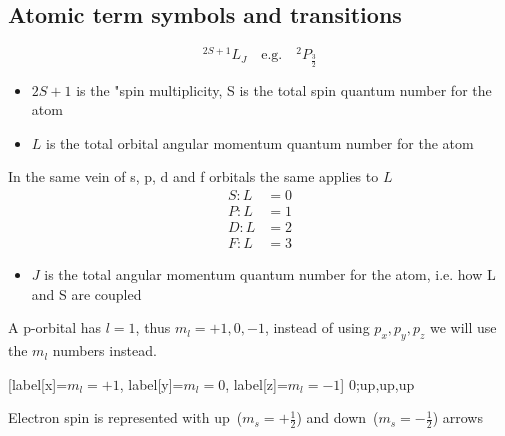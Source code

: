 \documentclass{article}
\begin{document}
    \subsection{Atomic term symbols and transitions}
    {\huge $$^{2S+1}L_J \quad \text{e.g.} \quad ^{2}P_{\frac{3}{2}}$$}

    \begin{itemize}
        \item $2S+1$ is the "spin multiplicity, S is the total spin quantum number for the atom
        \item $L$ is the total orbital angular momentum quantum number for the atom
    \end{itemize}
    In the same vein of s, p, d and f orbitals the same applies to $L$
    \begin{align*}
        S: L &= 0 \\
        P: L &= 1 \\
        D: L &= 2 \\
        F: L &= 3
    \end{align*}
    \begin{itemize}
        \item $J$ is the total angular momentum quantum number for the atom, i.e. how L and S are coupled
    \end{itemize}

    A p-orbital has $l=1$, thus $m_l = +1, 0, -1$, instead of using $p_x, p_y, p_z$ we will use the $m_l$ numbers instead.

    \begin{center}
        \begin{modiagram}[style=square, AO-width=20pt]
             [label[x]={$m_l=+1$}, label[y]={$m_l=0$}, label[z]={$m_l=-1$}] {0;up,up,up}
        \end{modiagram}
    \end{center}
    
    Electron spin is represented with up\ ($m_s = +\frac{1}{2}$) and down\ ($m_s = -\frac{1}{2}$) arrows
    \begin{modiagram}[style=square]
    \end{modiagram}
\end{document}

